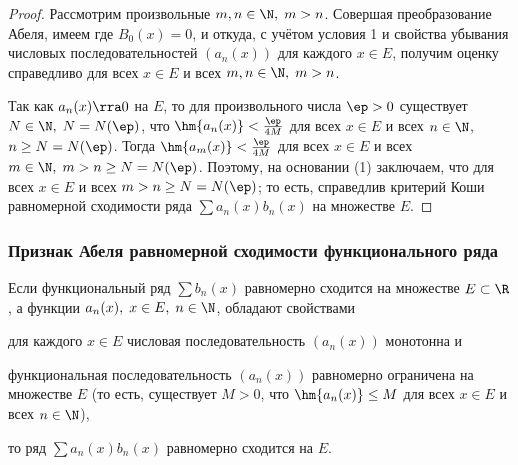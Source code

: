 \documentclass[a4paper]{article}
\begin{document}
\begin{proof}
Рассмотрим произвольные $m,n\in\N, \; m>n$. Совершая преобразование
Абеля, имеем  где $B_0(x)=0$, и откуда, с учётом условия 1 и
свойства убывания числовых последовательностей $(a_n(x))$ для
каждого $x\in E$, получим оценку  справедливо для всех $x\in E$ и
всех $m,n\in\N, \; m>n$.

Так как $a_n(x)\rra0$ на $E$, то для произвольного числа $\ep>0$
существует $N\in\N, \; N=N(\ep)$, что $\hm{a_n(x)} < \frac{\ep}{4M}$
для всех $x\in E$ и всех $n\in\N$, $n\ge N=N(\ep)$. Тогда
$\hm{a_m(x)} < \frac{\ep}{4M}$ для всех $x\in E$ и всех $m\in\N, \;
m>n\ge N=N(\ep)$. Поэтому, на основании (1) заключаем, что
 для всех $x\in E$ и всех $m>n \ge N=N(\ep)$;
то есть, справедлив критерий Коши равномерной сходимости ряда $\sum
a_n(x) b_n(x)$ на множестве $E$.
\end{proof}

\subsubsection{Признак Абеля равномерной сходимости функционального
ряда}

\begin{theorem}
Если функциональный ряд $\sum b_n(x)$ равномерно сходится на
множестве $E\subset\R$, а функции $a_n(x), \; x\in E, \; n\in\N$,
обладают свойствами \begin{points}{-2} \item для каждого $x\in E$
числовая последовательность $(a_n(x))$ монотонна и \item
функциональная последовательность $(a_n(x))$ равномерно ограничена
на множестве $E$ (то есть, существует $M>0$, что $\hm{a_n(x)}\le M$
для всех $x\in E$ и всех $n\in\N$), \end{points} то ряд $\sum a_n(x)
b_n(x)$ равномерно сходится на $E$.
\end{theorem}
\end{document}
